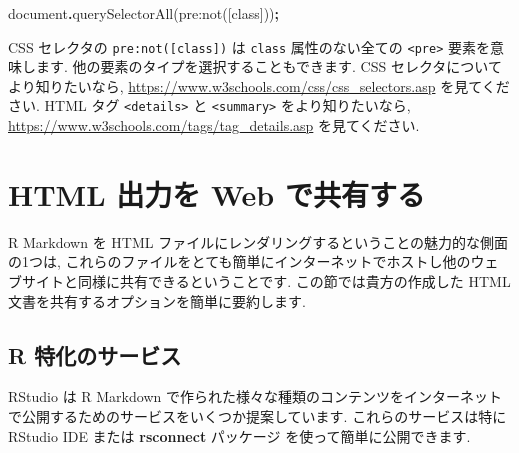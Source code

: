 \documentclass[
  11pt,
]{bxjsreport}
\newenvironment{Shaded}{\begin{snugshade}}{\end{snugshade}}
\newcommand{\BuiltInTok}[1]{#1}
\newcommand{\FunctionTok}[1]{\textcolor[rgb]{0.00,0.00,0.00}{#1}}
\newcommand{\NormalTok}[1]{#1}
\newcommand{\OperatorTok}[1]{\textcolor[rgb]{0.81,0.36,0.00}{\textbf{#1}}}
\newcommand{\StringTok}[1]{\textcolor[rgb]{0.31,0.60,0.02}{#1}}
\begin{document}
\begin{Shaded}
\begin{Highlighting}[]
\BuiltInTok{document}\OperatorTok{.}\FunctionTok{querySelectorAll}\NormalTok{(}\StringTok{\textquotesingle{}pre:not([class])\textquotesingle{}}\NormalTok{)}\OperatorTok{;}
\end{Highlighting}
\end{Shaded}

CSS セレクタの \texttt{pre:not({[}class{]})} は \texttt{class} 属性のない全ての \texttt{\textless{}pre\textgreater{}} 要素を意味します. 他の要素のタイプを選択することもできます. CSS セレクタについてより知りたいなら, \url{https://www.w3schools.com/css/css_selectors.asp} を見てください. HTML タグ \texttt{\textless{}details\textgreater{}} と \texttt{\textless{}summary\textgreater{}} をより知りたいなら, \url{https://www.w3schools.com/tags/tag_details.asp} を見てください.

\hypertarget{html-share}{%
\section{HTML 出力を Web で共有する}\label{html-share}}

R Markdown を HTML ファイルにレンダリングするということの魅力的な側面の1つは, これらのファイルをとても簡単にインターネットでホストし他のウェブサイトと同様に共有できるということです. この節では貴方の作成した HTML 文書を共有するオプションを簡単に要約します.

\hypertarget{r-specific-services}{%
\subsection{R 特化のサービス}\label{r-specific-services}}

RStudio は R Markdown で作られた様々な種類のコンテンツをインターネットで公開するためのサービスをいくつか提案しています. これらのサービスは特に RStudio IDE または \textbf{rsconnect} パッケージ \autocite{R-rsconnect} を使って簡単に公開できます.
\end{document}
